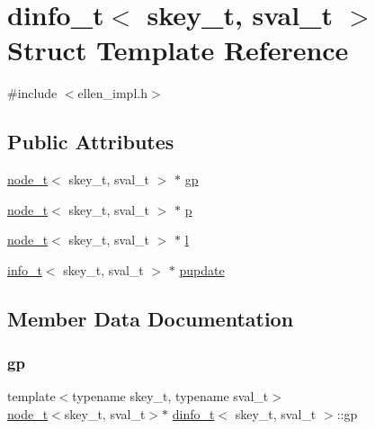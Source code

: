 \hypertarget{structdinfo__t}{}\section{dinfo\+\_\+t$<$ skey\+\_\+t, sval\+\_\+t $>$ Struct Template Reference}
\label{structdinfo__t}


{\ttfamily \#include $<$ellen\+\_\+impl.\+h$>$}

\subsection*{Public Attributes}
\begin{DoxyCompactItemize}
\item 
\hyperlink{structnode__t}{node\+\_\+t}$<$ skey\+\_\+t, sval\+\_\+t $>$ $\ast$ \hyperlink{structdinfo__t_a3161daad17a00b4a42a95f497d5d5ccc}{gp}
\item 
\hyperlink{structnode__t}{node\+\_\+t}$<$ skey\+\_\+t, sval\+\_\+t $>$ $\ast$ \hyperlink{structdinfo__t_acadd57ec2ca546d36effcea8bcd8494b}{p}
\item 
\hyperlink{structnode__t}{node\+\_\+t}$<$ skey\+\_\+t, sval\+\_\+t $>$ $\ast$ \hyperlink{structdinfo__t_ae1772329fe5f12589b528f570e68083b}{l}
\item 
\hyperlink{unioninfo__t}{info\+\_\+t}$<$ skey\+\_\+t, sval\+\_\+t $>$ $\ast$ \hyperlink{structdinfo__t_a550b10645a6869ee2f8e7c6b0c3d3327}{pupdate}
\end{DoxyCompactItemize}


\subsection{Member Data Documentation}
\mbox{\label{structdinfo__t_a3161daad17a00b4a42a95f497d5d5ccc}} 
\subsubsection{\texorpdfstring{gp}{gp}}
{\footnotesize\ttfamily template$<$typename skey\+\_\+t, typename sval\+\_\+t$>$ \\
\hyperlink{structnode__t}{node\+\_\+t}$<$skey\+\_\+t, sval\+\_\+t$>$$\ast$ \hyperlink{structdinfo__t}{dinfo\+\_\+t}$<$ skey\+\_\+t, sval\+\_\+t $>$\+::gp}

\mbox{\label{structdinfo__t_ae1772329fe5f12589b528f570e68083b}} 
